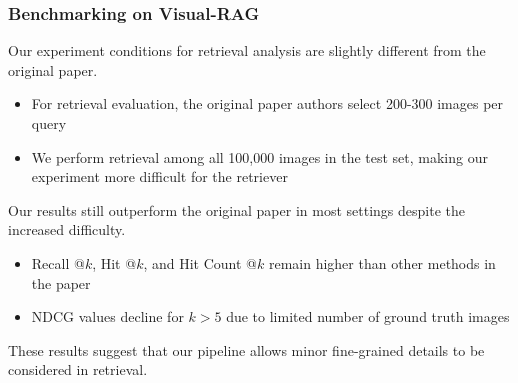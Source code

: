 \documentclass[aspectratio=1610]{beamer}
\begin{document}


    \begin{frame}
        \frametitle{Benchmarking on Visual-RAG}
        Our experiment conditions for retrieval analysis are slightly different from the original paper.
        \begin{itemize}
            \item For retrieval evaluation, the original paper authors select 200-300 images per query
            \item We perform retrieval among all 100,000 images in the test set, making our experiment more difficult for the retriever
        \end{itemize}

        Our results still outperform the original paper in most settings despite the increased difficulty.
        \begin{itemize}
            \item Recall @$k$, Hit @$k$, and Hit Count @$k$ remain higher than other methods in the paper
            \item NDCG values decline for $k > 5$ due to limited number of ground truth images
        \end{itemize}
        These results suggest that our pipeline allows minor fine-grained details to be considered in retrieval.
    \end{frame}
\end{document}
